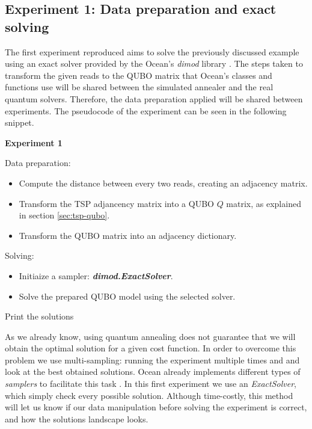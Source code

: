 \subsection{Experiment 1: Data preparation and exact solving}


The first experiment reproduced aims to solve the previously discussed example using an exact solver provided by the Ocean's \emph{dimod} library \cite{Dimod}. The steps taken to transform the given reads to the QUBO matrix that Ocean's classes and functions use will be shared between the simulated annealer and the real quantum solvers. Therefore, the data preparation applied will be shared between experiments. The pseudocode of the experiment can be seen in the following snippet.

\begin{algorithm}
	\caption*{\textbf{Experiment 1}}
	
	Data preparation:
	\begin{itemize}
		\item Compute the distance between every two reads, creating an adjacency matrix.
		\item Transform the TSP adjancency matrix into a QUBO $Q$ matrix, as explained in section \ref{sec:tsp-qubo}.
		\item Transform the QUBO matrix into an adjacency dictionary.
	\end{itemize}

	Solving:
	\begin{itemize}
		\item Initiaize a sampler: \textbf{\emph{dimod.ExactSolver}}.
		\item Solve the prepared QUBO model using the selected solver.
	\end{itemize}
	
	Print the solutions
\end{algorithm}

As we already know, using quantum annealing does not guarantee that we will obtain the optimal solution for a given cost function. In order to overcome this problem we use multi-sampling: running the experiment multiple times and and look at the best obtained solutions. Ocean already implements different types of \emph{samplers} to facilitate this task \cite{DWave-OceanDoc-Samplers}. In this first experiment we use an \emph{ExactSolver}, which simply check every possible solution. Although time-costly, this method will let us know if our data manipulation before solving the experiment is correct, and how the solutions landscape looks.

